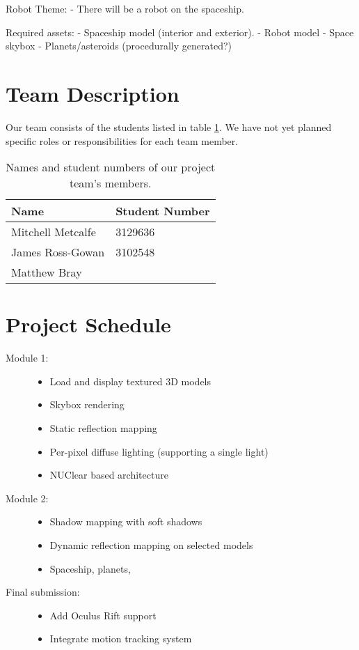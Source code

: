 \documentclass[11pt]{scrartcl} %
\begin{document}
    Robot Theme:
        - There will be a robot on the spaceship.

    Required assets:
        - Spaceship model (interior and exterior).
        - Robot model
        - Space skybox
        - Planets/asteroids (procedurally generated?)


\section*{Team Description}
    Our team consists of the students listed in table \ref{table:teamMembers}.
    We have not yet planned specific roles or responsibilities for each team
    member.

    \begin{table}[h]
    \centering
        \begin{tabular}{@{}ll@{}}
        \toprule
            Name & Student Number \\ \midrule
            Mitchell Metcalfe & 3129636 \\
            James Ross-Gowan & 3102548 \\
            Matthew Bray &  \\ \bottomrule
        \end{tabular}
        \caption[Team members]{Names and student numbers of our project team's members.}
        \label{table:teamMembers}
    \end{table}

\section*{Project Schedule}

\begin{description}
    \item[Module 1:]
        \begin{itemize}
            \item Load and display textured 3D models
            \item Skybox rendering
            \item Static reflection mapping
            \item Per-pixel diffuse lighting (supporting a single light)
            \item NUClear based architecture
        \end{itemize}
    \item[Module 2:]
        \begin{itemize}
            \item Shadow mapping with soft shadows
            \item Dynamic reflection mapping on selected models
            \item Spaceship, planets,
        \end{itemize}
    \item[Final submission:]
        \begin{itemize}
            \item Add Oculus Rift support
            \item Integrate motion tracking system
        \end{itemize}
\end{description}
\end{document}
